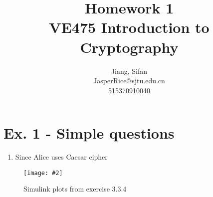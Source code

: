\documentclass[11pt,a4paper]{article}
\title{
	Homework 1\\
	VE475 Introduction to Cryptography
}
\author{
	Jiang, Sifan\\
	JasperRice@sjtu.edu.cn\\
	515370910040
}
\newcommand{\image}[3]{
	\begin{figure}[!ht]
		\centering
	    \texttt{[image: \#2]}
		\caption{#3}
		\label{fig:#2}
	\end{figure}
}
\begin{document}
\maketitle

\section*{Ex. 1 - Simple questions}
\begin{enumerate}
	\item Since Alice uses Caesar cipher
\end{enumerate}

	\image{0.75}{m334}{Simulink plots from exercise 3.3.4}
	
\end{document}
